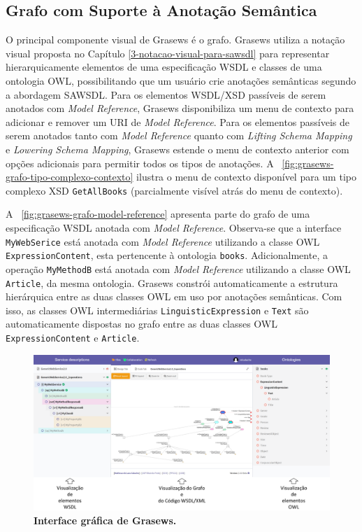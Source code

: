 \subsection{Grafo com Suporte à Anotação Semântica}\label{4-grasews-grafo}

O principal componente visual de Grasews é o grafo. Grasews utiliza a notação visual proposta no Capítulo \ref{3-notacao-visual-para-sawsdl} para representar hierarquicamente elementos de uma especificação WSDL e classes de uma ontologia OWL, possibilitando que um usuário crie anotações semânticas segundo a abordagem SAWSDL. Para os elementos WSDL/XSD passíveis de serem anotados com \textit{Model Reference}, Grasews disponibiliza um menu de contexto para adicionar e remover um URI de \textit{Model Reference}. Para os elementos passíveis de serem anotados tanto com \textit{Model Reference} quanto com \textit{Lifting Schema Mapping} e \textit{Lowering Schema Mapping}, Grasews estende o menu de contexto anterior com opções adicionais para permitir todos os tipos de anotações. A \figurename~\ref{fig:grasews-grafo-tipo-complexo-contexto} ilustra o menu de contexto disponível para um tipo complexo XSD \texttt{GetAllBooks} (parcialmente visível atrás do menu de contexto).

A \figurename~\ref{fig:grasews-grafo-model-reference} apresenta parte do grafo de uma especificação WSDL anotada com \textit{Model Reference}. Observa-se que a interface \texttt{MyWebSerice} está anotada com \textit{Model Reference} utilizando a classe OWL \texttt{ExpressionContent}, esta pertencente à ontologia \texttt{books}. Adicionalmente, a operação \texttt{MyMethodB} está anotada com \textit{Model Reference} utilizando a classe OWL \texttt{Article}, da mesma ontologia. Grasews constrói automaticamente a estrutura hierárquica entre as duas classes OWL em uso por anotações semânticas. Com isso, as classes OWL intermediárias \texttt{LinguisticExpression} e \texttt{Text} são automaticamente dispostas no grafo entre as duas classes OWL \texttt{ExpressionContent} e \texttt{Article}.

\begin{landscape}
    \begin{figure}[h]
        \includegraphics[scale=0.45]{4-grasews/imagens/grasews.png}
        \centering
        \caption[Interface gráfica de Grasews]{\textbf{Interface gráfica de Grasews.}}
        \label{fig:grasews}
    \end{figure}
\end{landscape}

